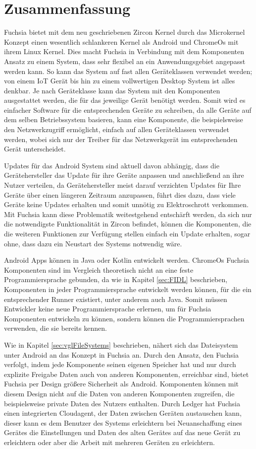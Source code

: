 \documentclass[a4paper]{scrartcl}
\begin{document}
\section{Zusammenfassung}
Fuchsia bietet mit dem neu geschriebenen Zircon Kernel durch das Microkernel Konzept einen wesentlich schlankeren Kernel als Android und ChromeOs mit ihrem Linux Kernel. Dies macht Fuchsia in Verbindung mit dem Komponenten Ansatz zu einem System, dass sehr flexibel an ein Anwendungsgebiet angepasst werden kann. So kann das System auf fast allen Geräteklassen verwendet werden; von einem IoT Gerät bis hin zu einem vollwertigen Desktop System ist alles denkbar. Je nach Geräteklasse kann das System mit den Komponenten ausgestattet werden, die für das jeweilige Gerät benötigt werden. Somit wird es einfacher Software für die entsprechenden Geräte zu schreiben, da alle Geräte auf dem selben Betriebssystem basieren, kann eine Komponente, die beispielsweise den Netzwerkzugriff ermöglicht, einfach auf allen Geräteklassen verwendet werden, wobei sich nur der Treiber für das Netzwerkgerät im entsprechenden Gerät unterscheidet.

Updates für das Android System sind aktuell davon abhängig, dass die Gerätehersteller das Update für ihre Geräte anpassen und anschließend an ihre Nutzer verteilen, da Gerätehersteller meist darauf verzichten Updates für Ihre Geräte über einen längeren Zeitraum anzupassen, führt dies dazu, dass viele Geräte keine Updates erhalten und somit unnötig zu Elektroschrott verkommen. Mit Fuchsia kann diese Problematik weitestgehend entschärft werden, da sich nur die notwendigste Funktionalität in Zircon befindet, können die Komponenten, die die weiteren Funktionen zur Verfügung stellen einfach ein Update erhalten, sogar ohne, dass dazu ein Neustart des Systems notwendig wäre.

Android Apps können in Java oder Kotlin entwickelt werden. ChromeOs Fuchsia Komponenten sind im Vergleich theoretisch nicht an eine feste Programmiersprache gebunden, da wie in Kapitel \ref{sec:FIDL} beschrieben, Komponenten in jeder Programmiersprache entwickelt werden können, für die ein entsprechender Runner existiert, unter anderem auch Java. Somit müssen Entwickler keine neue Programmiersprache erlernen, um für Fuchsia Komponenten entwickeln zu können, sondern können die Programmiersprachen verwenden, die sie bereits kennen.

Wie in Kapitel \ref{sec:vglFileSystems} beschrieben, nähert sich das Dateisystem unter Android an das Konzept in Fuchsia an. Durch den Ansatz, den Fuchsia verfolgt, indem jede Komponente seinen eigenen Speicher hat und nur durch explizite Freigabe Daten auch von anderen Komponenten, erreichbar sind, bietet Fuchsia per Design größere Sicherheit als Android. Komponenten können mit diesem Design nicht auf die Daten von anderen Komponenten zugreifen, die beispielsweise private Daten des Nutzers enthalten. Durch Ledger hat Fuchsia einen integrierten Cloudagent, der Daten zwischen Geräten austauschen kann, dieser kann es dem Benutzer des Systems erleichtern bei Neuanschaffung eines Gerätes die Einstellungen und Daten des alten Gerätes auf das neue Gerät zu erleichtern oder aber die Arbeit mit mehreren Geräten zu erleichtern.


\end{document}
